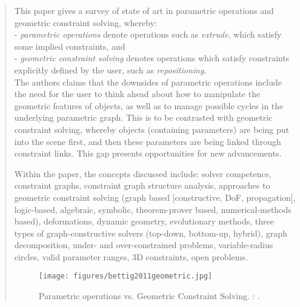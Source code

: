 		\begin{quote}
		\small
		This paper gives a survey of state of art in parametric operations and geometric
		constraint solving, whereby:\\
		- {\em parametric operations} denote operations such as {\em extrude}, which satisfy
		  some implied constraints, and\\
		- {\em geometric constraint solving} denotes operations which satisfy constraints
		  explicitly defined by the user, such as {\em repositioning}.\\
		The authors claims that the downsides of parametric operations include the need
		for the user to think ahead about how to manipulate the geometric features of objects,
		as well as to manage possible cycles in the underlying parametric graph. This
		is to be contrasted with geometric constraint solving, whereby objects (containing parameters)
		are being put into the scene first, and then these parameters are being linked
		through constraint links. This gap presents opportunities for new advancements.
		
		Within the paper, the concepts discussed include: 
		solver competence, constraint graphs, constraint graph structure analysis,
		approaches to geometric constraint solving 
		(graph based [constructive, DoF, propagation], logic-based, algebraic, symbolic, 
		theorem-prover based, numerical-methods based), deformations, dynamic geometry,
		evolutionary methods, three types of graph-constructive solvers (top-down, bottom-up,
		hybrid), graph decomposition, under- and over-constrained problems, variable-radius circles,
		valid parameter ranges, 3D constraints, open problems. 
		\begin{figure}[htb]
			\centering
			\texttt{[image: figures/bettig2011geometric.jpg]}
			\caption{
			Parametric operations vs. Geometric Constraint Solving.
			\citeauthor{bettig2011geometric}: 
			\cite{bettig2011geometric}.}
			\label{fig:bettig2011geometric}
		\end{figure}
		\end{quote}

